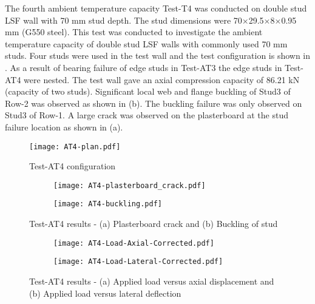 The fourth ambient temperature capacity Test-T4 was conducted on double stud LSF wall with 70 mm stud depth. The stud dimensions were 70$\times$29.5$\times$8$\times$0.95 mm (G550 steel). This test was conducted to investigate the ambient temperature capacity of double stud LSF walls with commonly used 70 mm studs. Four studs were used in the test wall and the test configuration is shown in . As a result of bearing failure of edge studs in Test-AT3 the edge studs in Test-AT4 were nested. The test wall gave an axial compression capacity of 86.21 kN (capacity of two studs). Significant local web and flange buckling of Stud3 of Row-2 was observed as shown in  (b). The buckling failure was only observed on Stud3 of Row-1. A large crack was observed on the plasterboard at the stud failure location as shown in  (a).
\begin{figure}[!htbp]
	\centering
			\texttt{[image: AT4-plan.pdf]}\\
		\caption{Test-AT4 configuration}
		\label{fig:AT4-plan}
\end{figure}  
\begin{figure}[!htbp]
	\centering
	\begin{subfigure}[b]{0.3\textwidth}
		\centering
		\texttt{[image: AT4-plasterboard\_crack.pdf]}
		\caption{}
		\label{subfig:AT4-plasterboard_crack}
	\end{subfigure}
	\begin{subfigure}[b]{0.3\textwidth}
		\centering
		\texttt{[image: AT4-buckling.pdf]}
		\caption{}
		\label{subfig:AT4-buckling}
	\end{subfigure}
	   \caption{Test-AT4 results - (a) Plasterboard crack and (b) Buckling of stud}
	   \label{fig:AT4-failure}
\end{figure}
\begin{figure}[!htbp]
	\centering
	\begin{subfigure}[b]{0.7\textwidth}
		\centering
		\texttt{[image: AT4-Load-Axial-Corrected.pdf]}
		\caption{}
		\label{subfig:AT4-Load-Axial-Corrected}
	\end{subfigure}
	\begin{subfigure}[b]{0.7\textwidth}
		\centering
		\texttt{[image: AT4-Load-Lateral-Corrected.pdf]}
		\caption{}
		\label{subfig:AT4-Load-Lateral-Corrected}
	\end{subfigure}
	   \caption{Test-AT4 results - (a) Applied load versus axial displacement and (b) Applied load versus lateral deflection}
	   \label{fig:AT4-results}
\end{figure}

